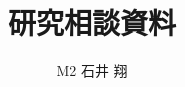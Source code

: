 \documentclass[a4]{jarticle}
\title{研究相談資料}
\author{M2 石井 翔} %
\begin{document}
\twocolumn{
\maketitle
}

%

\nocite{*}
\small
\end{document}

